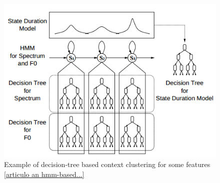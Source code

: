 \begin{figure}[!htb]
	\begin{center}
	\includegraphics[width=1\textwidth]{img/decision-tree.png}
	\end{center}
	\caption{\label{decision-tree}Example of decision-tree based context clustering for some features \ref{articulo an hmm-based...}}
\end{figure}
